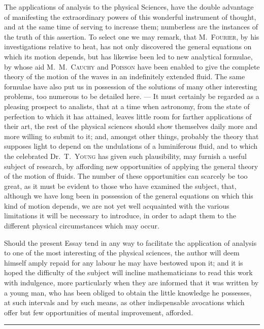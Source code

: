 \documentclass[12pt,notitlepage]{amsart}
\let\Person\textsc
\def\Crule{\begin{center}\rule[.5ex]{5em}{.2pt}\\[10pt]\end{center}}
\begin{document}
The applications of analysis to the physical Sciences, have the double
advantage of manifesting the extraordinary powers of this wonderful instrument
of thought, and at the same time of serving to increase them; numberless
are the instances of the truth of this assertion. To select one we may remark,
that M.~\Person{Fourier}, by his investigations relative to heat,
has not only discovered the general equations
on which its motion depends, but has likewise
been led to new analytical formulae, by whose aid M.~M.~\Person{Cauchy}
and \Person{Poisson}
have been enabled to give the complete theory of the motion of the waves
in an indefinitely extended fluid. The same formulae have also put us in
possession of the solutions of many other interesting problems, too numerous
to be detailed here. --- It must certainly be regarded as a pleasing prospect
to analists, that at a time when astronomy, from the state of perfection to
which it has attained, leaves little room for farther applications of their art,
the rest of the physical sciences should show themselves daily more and more
willing to submit to it; and, amongst other things, probably the theory that
supposes light to depend on the undulations of a luminiferous fluid, and to
which the celebrated Dr.~T.~\Person{Young} has
given such plausibility, may furnish
a useful subject of research, by affording new opportunities of applying the
general theory of the motion of fluids. The number of these opportunities
can scarcely be too great, as it must be evident to those who have examined
the subject, that, although we have long been in possession of the general
equations on which this kind of motion depends, we are not yet well
acquainted with the various limitations it will be necessary to introduce, in
order to adapt them to the different physical circumstances which may occur.

Should the present Essay tend in any way to facilitate thc application
of analysis to one of the most interesting of the physical sciences, the author
will deem himself amply repaid for any labour he may have bestowed upon
it; and it is hoped the difficulty of the subject will incline mathematicians to
read this work with indulgence, more particularly when they are informed
that it was written by a young man, who has been obliged to obtain the little
knowledge he possesses, at such intervals and by such means, as other 
indispensable avocations which offer
but few opportunities of mental improvement,
afforded.
\Crule
\bigskip

\end{document}
